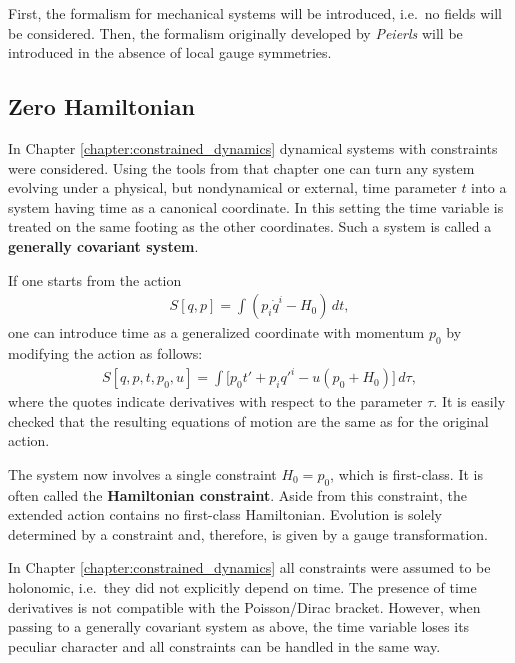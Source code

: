     First, the formalism for mechanical systems will be introduced, i.e.~no fields will be considered. Then, the formalism originally developed by \textit{Peierls} will be introduced in the absence of local gauge symmetries.

\subsection{Zero Hamiltonian}

    In Chapter \ref{chapter:constrained_dynamics} dynamical systems with constraints were considered. Using the tools from that chapter one can turn any system evolving under a physical, but nondynamical or external, time parameter $t$ into a system having time as a canonical coordinate. In this setting the time variable is treated on the same footing as the other coordinates. Such a system is called a \textbf{generally covariant system}.

    If one starts from the action
    \begin{gather}
        S[q,p] = \int\left(p_i\dot{q}^i-H_0\right)\,dt,
    \end{gather}
    one can introduce time as a generalized coordinate with momentum $p_0$ by modifying the action as follows:
    \begin{gather}
        S[q,p,t,p_0,u] = \int\big[p_0t'+p_iq'^i-u(p_0+H_0)\big]\,d\tau,
    \end{gather}
    where the quotes indicate derivatives with respect to the parameter $\tau$. It is easily checked that the resulting equations of motion are the same as for the original action.

    The system now involves a single constraint $H_0=p_0$, which is first-class. It is often called the \textbf{Hamiltonian constraint}. Aside from this constraint, the extended action contains no first-class Hamiltonian. Evolution is solely determined by a constraint and, therefore, is given by a gauge transformation.

    \begin{remark}
        In Chapter \ref{chapter:constrained_dynamics} all constraints were assumed to be holonomic, i.e.~they did not explicitly depend on time. The presence of time derivatives is not compatible with the Poisson/Dirac bracket. However, when passing to a generally covariant system as above, the time variable loses its peculiar character and all constraints can be handled in the same way.
    \end{remark}

